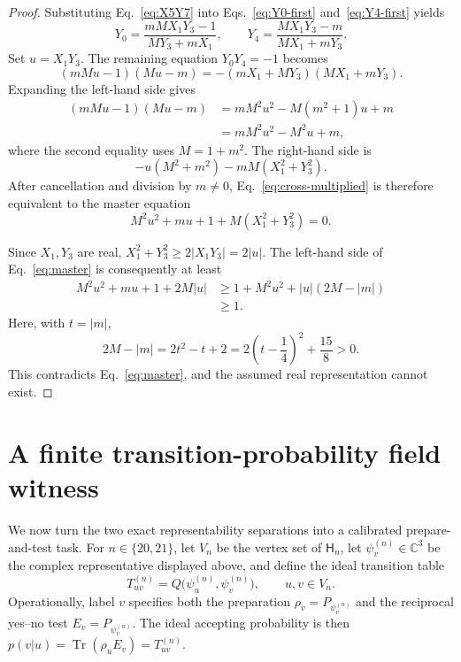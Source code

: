 \documentclass[twocolumn,aps,pra,floatfix,amsmath,amssymb,longbibliography]{revtex4-2}
\theoremstyle{definition}
\theoremstyle{remark}
\newcommand{\C}{\mathbb C}
\begin{document}
\begin{proof}
Substituting Eq.~\eqref{eq:X5Y7} into
Eqs.~\eqref{eq:Y0-first} and~\eqref{eq:Y4-first} yields
\begin{equation}
 Y_0=\frac{mMX_1Y_3-1}{MY_3+mX_1},\qquad
 Y_4=\frac{MX_1Y_3-m}{MX_1+mY_3}.
 \label{eq:Y0Y4-final}
\end{equation}
Set $u=X_1Y_3$.  The remaining equation $Y_0Y_4=-1$ becomes
\begin{equation}
 (mMu-1)(Mu-m)=-(mX_1+MY_3)(MX_1+mY_3).
 \label{eq:cross-multiplied}
\end{equation}
Expanding the left-hand side gives
\begin{align*}
 (mMu-1)(Mu-m)
 &=mM^2u^2-M(m^2+1)u+m\\
 &=mM^2u^2-M^2u+m,
\end{align*}
where the second equality uses $M=1+m^2$.
The right-hand side is
\[
 -u(M^2+m^2)-mM(X_1^2+Y_3^2).
\]
After cancellation and division by $m\ne0$, Eq.~\eqref{eq:cross-multiplied}
is therefore equivalent to the master equation
\begin{equation}
 M^2u^2+mu+1+M(X_1^2+Y_3^2)=0.
 \label{eq:master}
\end{equation}

Since $X_1,Y_3$ are real,
$X_1^2+Y_3^2\ge2|X_1Y_3|=2|u|$.  The left-hand side of
Eq.~\eqref{eq:master} is consequently at least
\begin{align*}
 M^2u^2+mu+1+2M|u|
 &\ge 1+M^2u^2+|u|(2M-|m|)\\
 &\ge1.
\end{align*}
Here, with $t=|m|$,
\[
 2M-|m|=2t^2-t+2=2\left(t-\frac14\right)^2+\frac{15}{8}>0.
\]
This contradicts
Eq.~\eqref{eq:master}, and the assumed real representation cannot exist.
\end{proof}

\section{A finite transition-probability field witness}
\label{sec:operational}

We now turn the two exact representability separations into a calibrated
prepare-and-test task.  For $n\in\{20,21\}$, let $V_n$ be the vertex set of
$\mathsf H_n$, let $\psi_v^{(n)}\in\C^3$ be the complex representative
displayed above, and define the ideal transition table
\begin{equation}
 T_{uv}^{(n)}=Q\bigl(\psi_u^{(n)},\psi_v^{(n)}\bigr),
 \qquad u,v\in V_n.
 \label{eq:target-table}
\end{equation}
Operationally, label $v$ specifies both the preparation
$\rho_v=P_{\psi_v^{(n)}}$ and the reciprocal yes--no test
$E_v=P_{\psi_v^{(n)}}$.  The ideal accepting probability is then
$p(v|u)=\operatorname{Tr}(\rho_uE_v)=T_{uv}^{(n)}$.
\end{document}
